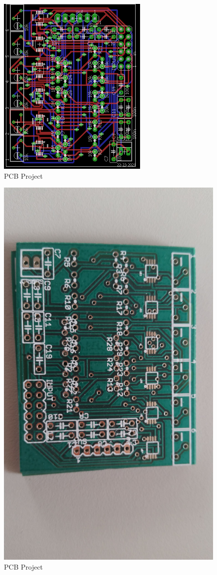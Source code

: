 \begin{figure}[!htpb]
\centering
\includegraphics[scale=1.5]{images/TCC_INA}
\caption{PCB Project}
\end{figure}

\begin{figure}[!htpb]
\centering
\includegraphics[scale=0.08]{images/INA_board}
\caption{PCB Project}
\end{figure}

